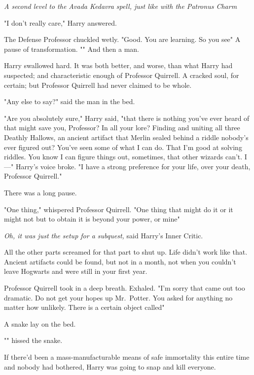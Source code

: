 \emph{A second level to the Avada Kedavra spell, just like with the Patronus
Charm{\el}}

"I don't really care," Harry answered.

The Defense Professor chuckled wetly. "Good. You are{\el} learning. So you
see{\el}" A pause of transformation. "" And then a man.

Harry swallowed hard. It was both better, and worse, than what Harry had
suspected; and characteristic enough of Professor Quirrell. A cracked soul, for
certain; but Professor Quirrell had never claimed to be whole.

"Any else{\el} to say?" said the man in the bed.

"Are you absolutely sure," Harry said, "that there is nothing you've ever heard
of that might save you, Professor? In all your lore? Finding and uniting all
three Deathly Hallows, an ancient artifact that Merlin sealed behind a riddle
nobody's ever figured out? You've seen some of what I can do. That I'm good at
solving riddles. You know I can figure things out, sometimes, that other
wizards can't. I\mbox{---}" Harry's voice broke. "I have a strong preference for your
life, over your death, Professor Quirrell."

There was a long pause.

"One thing," whispered Professor Quirrell. "One thing{\el} that might do
it{\el} or it might not{\el} but to obtain it{\el} is beyond your
power, or mine{\el}"

\emph{Oh, it was just the setup for a subquest,} said Harry's Inner Critic.

All the other parts screamed for that part to shut up. Life didn't work like
that. Ancient artifacts could be found, but not in a month, not when you
couldn't leave Hogwarts and were still in your first year.

Professor Quirrell took in a deep breath. Exhaled. "I'm sorry{\el} that came
out{\el} too dramatic. Do not{\el} get your hopes up{\el} Mr.~Potter.
You asked{\el} for anything{\el} no matter how unlikely. There is{\el}
a certain object{\el} called{\el}"

A snake lay on the bed.

"" hissed the snake.

If there'd been a mass-manufacturable means of safe immortality this entire
time and nobody had bothered, Harry was going to snap and kill everyone.


